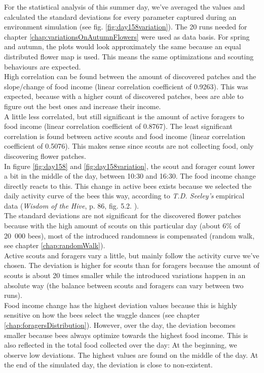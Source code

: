 		For the statistical analysis of this summer day, we've averaged the values and calculated the standard deviations for every parameter captured during an environment simulation (see fig. \ref{fig:day158variation}). The 20 runs needed for chapter \ref{chap:variationsOnAutumnFlowers} were used as data basis. For spring and autumn, the plots would look approximately the same because an equal distributed flower map is used. This means the same optimizations and scouting behaviours are expected.\\
		High correlation can be found between the amount of discovered patches and the slope/change of food income (linear correlation coefficient of 0.9263). This was expected, because with a higher count of discovered patches, bees are able to figure out the best ones and increase their income.\\
		A little less correlated, but still significant is the amount of active foragers to food income (linear correlation coefficient of 0.8767). The least significant correlation is found between active scouts and food income (linear correlation coefficient of 0.5076). This makes sense since scouts are not collecting food, only discovering flower patches.\\
		In figure \ref{fig:day158} and \ref{fig:day158variation}, the scout and forager count lower a bit in the middle of the day, between 10:30 and 16:30. The food income change directly reacts to this. This change in active bees exists because we selected the daily activity curve of the bees this way, according to \textit{T.D. Seeley's} empirical data (\textit{Wisdom of the Hive}, p. 86, fig. 5.2. \cite{seeley95}).\\
		
		The standard deviations are not significant for the discovered flower patches because with the high amount of scouts on this particular day (about 6\% of 20~000 bees), most of the introduced randomness is compensated (random walk, see chapter \ref{chap:randomWalk}).\\
		Active scouts and foragers vary a little, but mainly follow the activity curve we've chosen. The deviation is higher for scouts than for foragers because the amount of scouts is about 20 times smaller while the introduced variations happen in an absolute way (the balance between scouts and foragers can vary between two runs).\\
		Food income change has the highest deviation values because this is highly sensitive on how the bees select the waggle dances (see chapter \ref{chap:foragersDistribution}). However, over the day, the deviation becomes smaller because bees always optimize towards the highest food income. This is also reflected in the total food collected over the day: At the beginning, we observe low deviations. The highest values are found on the middle of the day. At the end of the simulated day, the deviation is close to non-existent.
		
